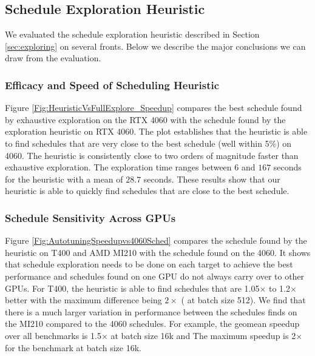 \subsection{Schedule Exploration Heuristic}
We evaluated the schedule exploration heuristic described in Section \ref{sec:exploring} on several fronts.
Below we describe the major conclusions we can draw from the evaluation.

\subsubsection*{Efficacy and Speed of Scheduling Heuristic}
Figure \ref{Fig:HeuristicVsFullExplore_Speedup} compares the best schedule found by exhaustive exploration on the RTX 4060 
with the schedule found by the exploration heuristic on RTX 4060.
The plot establishes that the 
heuristic is able to find schedules that are very close to the best schedule (well 
within 5\%) on 4060. The heuristic
is consistently close to two orders of magnitude faster than exhaustive exploration. 
The exploration time ranges between $6$ and $167$ seconds for the heuristic with a mean of $28.7$ seconds.
These results show that our heuristic is able to quickly find schedules that are close to the best schedule.

\subsubsection*{Schedule Sensitivity Across GPUs}
Figure \ref{Fig:AutotuningSpeedupvs4060Sched}
compares the schedule found by the heuristic on T400 and AMD MI210 with the schedule found on the 4060.
It shows that schedule exploration needs to be done on each target to achieve the best performance
and schedules found on one GPU do not always carry over to other GPUs.
For T400, the heuristic is able to find schedules that are 1.05$\times$ to 1.2$\times$ better 
with the maximum difference being $2\times$ ( at batch size 512).
We find that there is a much larger variation in performance 
between the schedules \Treebeard{} finds on the MI210 compared to the 4060 schedules. For example, 
the geomean speedup over all benchmarks is 1.5$\times$ at batch size 16k and 
The maximum speedup is 2$\times$ for the  benchmark at batch size 16k.


